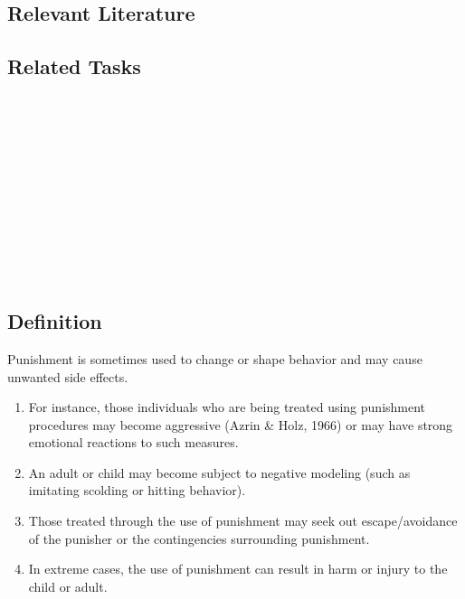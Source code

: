 \subsection{Relevant Literature}
\begin{refsection}
\nocite{test,alang2017police,clayton2018black}
\printbibliography[heading=none]
\end{refsection}
%
\subsection{Related Tasks}
\fourdOne{}\\
\fourdTwo{}\\
\fourdTwentyOne{}\\
\foureEleven{}\\
\fouriSeven{}\\
\fourjFour{}\\
\fourjFive{}\\
\fourjSix{}\\
\fourjSeven{}\\
\fourjEleven{}\\
%
%
%
%
%
%
%
\section[\fourcTwo{}]{\fourcTwo{}%
              }
\subsection{Definition}
Punishment is sometimes used to change or shape behavior and may cause unwanted side effects. 
\begin{enumerate}
\item For instance, those individuals who are being treated using punishment procedures may become aggressive (Azrin \& Holz, 1966) or may have strong emotional reactions to such measures.  
\item An adult or child may become subject to negative modeling (such as imitating scolding or hitting behavior).
\item Those treated through the use of punishment may seek out escape/avoidance of the punisher or the contingencies surrounding punishment. 
\item In extreme cases, the use of punishment can result in harm or injury to the child or adult.  
\end{enumerate}

